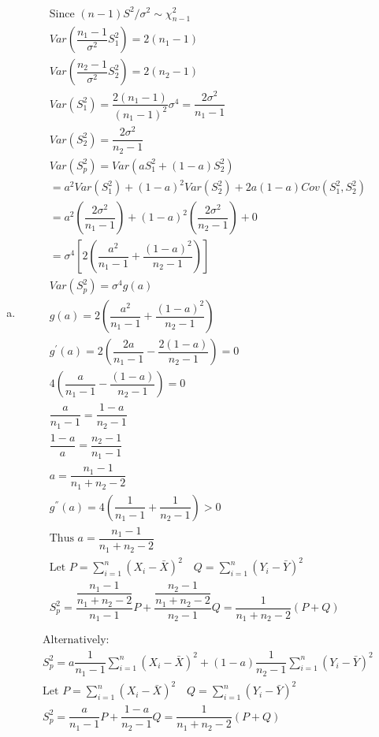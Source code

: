 \documentclass{article}
\newcommand{\sg}{\sigma}
\newcommand{\sumn}{\sum_{i=1}^{n}}
\begin{document}
\begin{flushleft}
\begin{enumerate}[(a)]
	\item 
\begin{multline*}\\
\text{Since } (n-1)S^2/\sg^2 \sim \chi^2_{n-1}\\
Var(\dfrac{n_1-1}{\sg^2}S_1^2)=2(n_1-1)\\
Var(\dfrac{n_2-1}{\sg^2}S_2^2)=2(n_2-1)\\
Var(S_1^2)=\dfrac{2(n_1-1)}{(n_1-1)^2}\sg^4=\dfrac{2\sg^2}{n_1-1}\\
Var(S_2^2)=\dfrac{2\sg^2}{n_2-1}\\
Var(S_p^2)=Var(aS_1^2+(1-a)S_2^2)\\
=a^2Var(S_1^2)+(1-a)^2Var(S_2^2)+2a(1-a)Cov(S_1^2,S_2^2)\\
=a^2\left(\dfrac{2\sg^2}{n_1-1}\right)+(1-a)^2\left(\dfrac{2\sg^2}{n_2-1}\right)+0\\
=\sg^4\left[2\left(\dfrac{a^2}{n_1-1}+\dfrac{(1-a)^2}{n_2-1}\right)\right]\\
Var(S_p^2)=\sigma^4g(a)\\
g(a)=2\left(\dfrac{a^2}{n_1-1}+\dfrac{(1-a)^2}{n_2-1}\right)\\
g^{\prime}(a)=2\left(\dfrac{2a}{n_1-1}-\dfrac{2(1-a)}{n_2-1}\right)=0\\
4\left(\dfrac{a}{n_1-1}-\dfrac{(1-a)}{n_2-1}\right)=0\\
\dfrac{a}{n_1-1}=\dfrac{1-a}{n_2-1}\\
\dfrac{1-a}{a}=\dfrac{n_2-1}{n_1-1}\\
a=\dfrac{n_1-1}{n_1+n_2-2}\\
g^{''}(a)=4\left(\dfrac{1}{n_1-1}+\dfrac{1}{n_2-1}\right)>0\\
\text{Thus } a=\dfrac{n_1-1}{n_1+n_2-2} \\
\text{Let } P=\sumn(X_i-\bar{X})^2 \quad Q=\sumn(Y_i-\bar{Y})^2\\
S_p^2=\dfrac{\dfrac{n_1-1}{n_1+n_2-2}}{n_1-1}P+\dfrac{\dfrac{n_2-1}{n_1+n_2-2}}{n_2-1}Q
=\dfrac{1}{n_1+n_2-2}(P+Q)\\
\end{multline*}	
\begin{multline*}\\
\text{Alternatively:}\\
S_p^2=a\dfrac{1}{n_1-1}\sumn(X_i-\bar{X})^2+(1-a)\dfrac{1}{n_2-1}\sumn(Y_i-\bar{Y})^2\\\text{Let } P=\sumn(X_i-\bar{X})^2 \quad Q=\sumn(Y_i-\bar{Y})^2\\
S_p^2=\dfrac{a}{n_1-1}P+\dfrac{1-a}{n_2-1}Q=\dfrac{1}{n_1+n_2-2}(P+Q)\\

\end{multline*}
\end{enumerate}
\end{flushleft}
\end{document}
